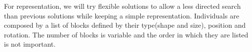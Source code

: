 \documentclass[sigconf]{acmart}
\begin{document}
For representation, we will try flexible solutions to allow a less directed search than previous solutions while keeping a 
simple representation. 
Individuals are composed by a list of blocks 
defined by their type(shape and size), position and rotation.
The number of blocks is variable and the order in which 
they are listed is not important. 


\end{document}
